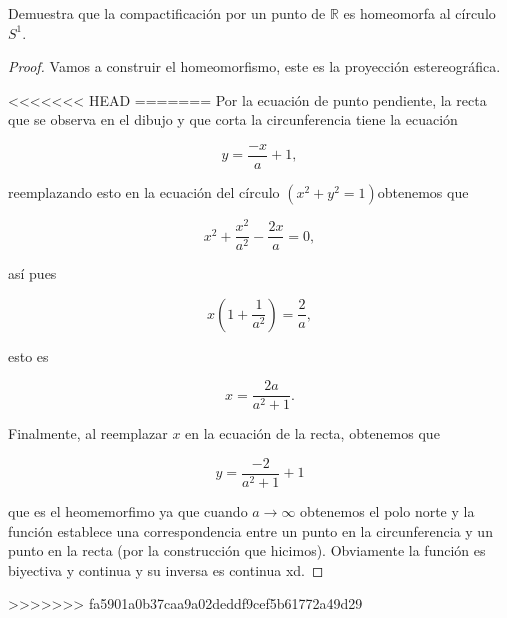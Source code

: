 
\item Demuestra que la compactificación por un punto de $\mathbb{R}$ es homeomorfa al círculo $S^1$.\\

\begin{proof}
    Vamos a construir el homeomorfismo, este es la proyección estereográfica.

\begin{center}
    
\end{center}

<<<<<<< HEAD
=======
Por la ecuación de punto pendiente, la recta que se observa en el dibujo y que corta la circunferencia  tiene la ecuación 

$$y=\frac{-x}{a}+1,$$

reemplazando esto en la ecuación del círculo $(x^2+y^2=1)$obtenemos que 

$$x^2+\frac{x^2}{a^2}-\frac{2x}{a}=0,$$

así pues

$$x\left(1+\frac{1}{a^2}\right)=\frac{2}{a},$$

esto es 

$$x=\frac{2a}{a^2+1}.$$

Finalmente, al reemplazar $x$ en la ecuación de la recta, obtenemos que 

$$y=\frac{-2}{a^2+1}+1$$

que es el heomemorfimo ya que cuando $a\to \infty$ obtenemos el polo norte y la función establece una correspondencia entre un punto en la circunferencia y un punto en la recta (por la construcción que hicimos). Obviamente la función es biyectiva y continua y su inversa es continua xd.

\end{proof}
>>>>>>> fa5901a0b37caa9a02deddf9cef5b61772a49d29
